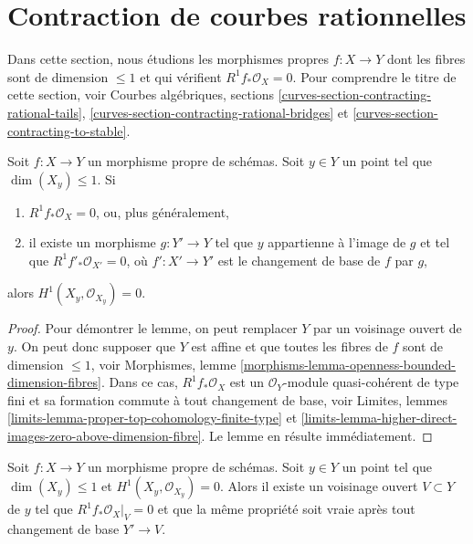 \section{Contraction de courbes rationnelles}
\label{section-contracting}

\noindent
Dans cette section, nous étudions les morphismes propres $f : X \to Y$ dont les fibres
sont de dimension $\leq 1$ et qui vérifient $R^1f_*\mathcal{O}_X = 0$.
Pour comprendre le titre de cette section, voir
Courbes algébriques, sections
\ref{curves-section-contracting-rational-tails},
\ref{curves-section-contracting-rational-bridges} et
\ref{curves-section-contracting-to-stable}.

\begin{lemma}
\label{lemma-check-h1-fibre-zero}
Soit $f : X \to Y$ un morphisme propre de schémas. Soit $y \in Y$
un point tel que $\dim(X_y) \leq 1$. Si
\begin{enumerate}
\item $R^1f_*\mathcal{O}_X = 0$, ou, plus généralement,
\item il existe un morphisme $g : Y' \to Y$ tel que $y$ appartienne à l'image
de $g$ et tel que $R^1f'_*\mathcal{O}_{X'} = 0$, où $f' : X' \to Y'$
est le changement de base de $f$ par $g$,
\end{enumerate}
alors $H^1(X_y, \mathcal{O}_{X_y}) = 0$.
\end{lemma}

\begin{proof}
Pour démontrer le lemme, on peut remplacer $Y$ par un voisinage ouvert de $y$.
On peut donc supposer que $Y$ est affine
et que toutes les fibres de $f$ sont de dimension $\leq 1$, voir
Morphismes, lemme \ref{morphisms-lemma-openness-bounded-dimension-fibres}.
Dans ce cas, $R^1f_*\mathcal{O}_X$ est un $\mathcal{O}_Y$-module quasi-cohérent
de type fini et sa formation commute à tout changement de base, voir
Limites, lemmes \ref{limits-lemma-proper-top-cohomology-finite-type} et
\ref{limits-lemma-higher-direct-images-zero-above-dimension-fibre}.
Le lemme en résulte immédiatement.
\end{proof}

\begin{lemma}
\label{lemma-h1-fibre-zero}
Soit $f : X \to Y$ un morphisme propre de schémas. Soit $y \in Y$
un point tel que $\dim(X_y) \leq 1$ et $H^1(X_y, \mathcal{O}_{X_y}) = 0$.
Alors il existe un voisinage ouvert $V \subset Y$ de $y$ tel que
$R^1f_*\mathcal{O}_X|_V = 0$
et que la même propriété soit vraie après tout changement de base $Y' \to V$.
\end{lemma}


